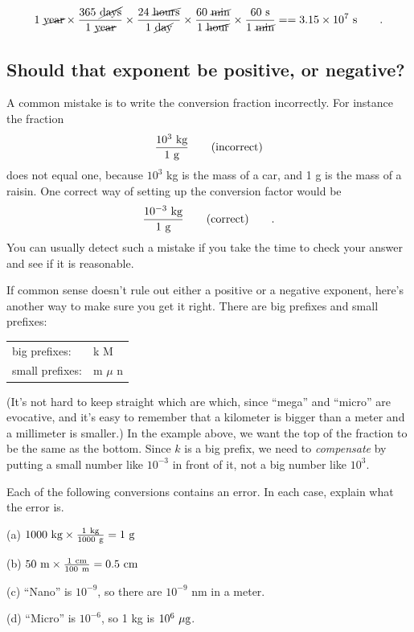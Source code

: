 \begin{multline*}
1\ \cancel{\text{year}} \times
\frac{365\ \cancel{\text{days}}}{1\ \cancel{\text{year}}} \times
\frac{24\ \cancel{\text{hours}}}{1\ \cancel{\text{day}}} \times
\frac{60\ \cancel{\text{min}}}{1\ \cancel{\text{hour}}} \times
\frac{60\ \textup{s}}{1\ \cancel{\text{min}}} = 
= 3.15 \times 10^7\ \textup{s}   \qquad   .
\end{multline*}

\subsection{Should that exponent be positive, or negative?}

A common mistake is to write the conversion fraction
incorrectly. For instance the fraction
\begin{equation*}
  \frac{10^3\ \kgunit}{1\ \gunit} \qquad \text{(incorrect)}
\end{equation*}
does not equal one, because $10^3$  kg is the mass of a car,
and 1 g is the mass of a raisin. One correct way of
setting up the conversion factor would be
\begin{equation*}
  \frac{10^{-3}\ \textup{kg}}{1\ \textup{g}} \qquad \text{(correct)} \qquad .
\end{equation*}
You can usually detect such a mistake if you take the time
to check your answer and see if it is reasonable.

If common sense doesn't rule out either a positive or a
negative exponent, here's another way to make sure you get
it right. There are big prefixes and small prefixes:
\begin{center}
\begin{tabular}{ll}
    big prefixes:    & k \quad    M \\
    small prefixes:  &  m  \quad  $\mu$  \quad   n \\
\end{tabular}
\end{center}

\noindent (It's not hard to keep straight which are which, since
``mega'' and ``micro'' are evocative, and it's easy to
remember that a kilometer is bigger than a meter and a
millimeter is smaller.) In the example above, we want the
top of the fraction to be the same as the bottom. Since $k$
is a big prefix, we need to \emph{compensate} by putting a
small number like $10^{-3}$  in front of it, not a big
number like $10^3$.

\begin{exmp}
Each of the following conversions contains an error.  In
each case, explain what the error is.

(a) $1000\ \kgunit \times \frac{1\ \kgunit}{1000\ \gunit}  = 1\ \gunit$

(b) $50\ \munit \times \frac{1\ \zu{cm}}{100\ \munit}    =  0.5\ \zu{cm}$

(c) ``Nano'' is $10^{-9}$, so there are $10^{-9}$  nm in a meter.

(d) ``Micro'' is $10^{-6}$, so 1 kg is $10^6\ \mu\textup{g}$.

\end{exmp}
\divider
\vspace{2mm}


